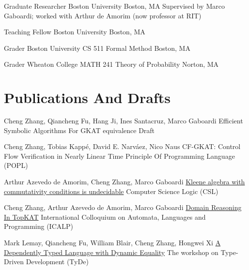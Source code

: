 \documentclass[10pt]{moderncv}        %
\let\oldsection=\section
\renewcommand{\section}{%
  \needspace{\baselineskip}
  \oldsection
}
\begin{document}
{Graduate Researcher}
{Boston University}
{Boston, MA}{}
{
Supervised by Marco Gaboardi; worked with Arthur de Amorim (now professor at RIT)
}

{Teaching Fellow}
{Boston University}
{Boston, MA}{}
{%
}

{Grader}
{Boston University CS 511 Formal Method}
{Boston, MA}{}
{%
}

{Grader}
{Wheaton College MATH 241 Theory of Probability}
{Norton, MA}{}
{%
}

\section{Publications And Drafts}

{Cheng Zhang, Qiancheng Fu, Hang Ji, Ines Santacruz, Marco Gaboardi}
{Efficient Symbolic Algorithms For GKAT equivalence}
{Draft}
{}{}

{Cheng Zhang, Tobias Kappé, David E. Narváez, Nico Naus}
{CF-GKAT: Control Flow Verification in Nearly Linear Time}
{Principle Of Programming Language (POPL)}
{}{}

{Arthur Azevedo de Amorim, Cheng Zhang, Marco Gaboardi}
{\href{https://hal.science/hal-04534715/}{Kleene algebra with commutativity conditions is undecidable}}
{Computer Science Logic (CSL)}
{}{}

{Cheng Zhang, Arthur Azevedo de Amorim, Marco Gaboardi}
{\href{https://arxiv.org/abs/2404.18417}{Domain Reasoning In TopKAT}}
{International Colloquium on Automata, Languages and Programming (ICALP)}
{}{}

{Mark Lemay, Qiancheng Fu, William Blair, Cheng Zhang, Hongwei Xi}
{\href{https://doi.org/10.1145/3609027.3609407}{A Dependently Typed Language with Dynamic Equality}}
{The workshop on Type-Driven Development (TyDe)}
{}{}
\end{document}
